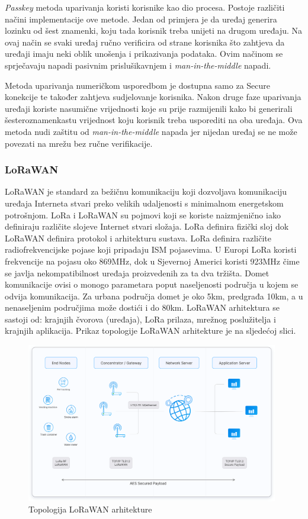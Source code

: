 \documentclass[times, utf8, diplomski]{fer}
\begin{document}
\emph{Passkey} metoda uparivanja koristi korisnike kao dio procesa. Postoje različiti načini implementacije ove metode. Jedan od primjera je da uređaj generira lozinku od šest znamenki, koju tada korisnik treba unijeti na drugom uređaju. Na ovaj način se svaki uređaj ručno verificira od strane korisnika što zahtjeva da uređaji imaju neki oblik unošenja i prikazivanja podataka. Ovim načinom se sprječavaju napadi pasivnim prislušikavnjem i \emph{man-in-the-middle} napadi.

Metoda uparivanja numeričkom usporedbom je dostupna samo za Secure konekcije te također zahtjeva sudjelovanje korisnika. Nakon druge faze uparivanja uređaji koriste nasumične vrijednosti koje su prije razmijenili kako bi generirali šesteroznamenkastu vrijednost koju korisnik treba usporediti na oba uređaja. Ova metoda nudi zaštitu od \emph{man-in-the-middle} napada jer nijedan uređaj se ne može povezati na mrežu bez ručne verifikacije\citep{Kacherovska2019Aug}.


\subsubsection{LoRaWAN}
LoRaWAN  je standard za bežičnu komunikaciju koji dozvoljava komunikaciju uređaja Interneta stvari preko velikih udaljenosti s minimalnom energetskom potrošnjom. LoRa i LoRaWAN su pojmovi koji se koriste naizmjenično iako definiraju različite slojeve Internet stvari složaja. LoRa definira fizički sloj dok LoRaWAN definira protokol i arhitekturu sustava. LoRa definira različite radiofrekvencijske pojase koji pripadaju ISM pojasevima. U Europi LoRa koristi frekvencije na pojasu oko 869MHz, dok u Sjevernoj Americi koristi 923MHz čime se javlja nekompatibilnost uređaja proizvedenih za ta dva tržišta. Domet komunikacije ovisi o monogo parametara poput naseljenosti područja u kojem se odvija komunikacija. Za urbana područja domet je oko 5km, predgrađa 10km, a u nenaseljenim područjima može dostići i do 80km.
LoRaWAN arhitektura se sastoji od: krajnjih čvorova (uređaja), LoRa prilaza, mrežnog poslužitelja i krajnjih aplikacija. Prikaz topologije LoRaWAN arhitekture je na sljedećoj slici.
\begin{figure}[H]
    \centering
    \includegraphics[width=11cm]{images/lorawan.png}
    \caption{Topologija LoRaWAN arhitekture\citep{LoraWANImg}}
    \label{fig:lorawan}
\end{figure}
\end{document}
